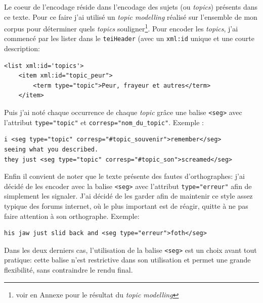 \documentclass[onecolumn,12pt]{article}
\begin{document}
Le coeur de l'encodage réside dans l'encodage des sujets (ou \textit{topics}) présents dans ce texte. Pour ce faire j'ai utilisé un \textit{topic modelling} réalisé sur l'ensemble de mon corpus pour déterminer quels \textit{topics} souligner\footnote{ voir en Annexe pour le résultat du \textit{topic modelling}}. 
Pour encoder les \textit{topics}, j'ai commencé par les lister dans le \texttt{teiHeader} (avec un \texttt{xml:id} unique et une courte description: 
\begin{singlespace}
    
\begin{verbatim}
<list xml:id='topics'>
    <item xml:id="topic_peur">
        <term type="topic">Peur, frayeur et autres</term>
    </item>
\end{verbatim}
\end{singlespace}

Puis j'ai noté chaque occurrence de chaque \textit{topic} grâce une balise \texttt{<seg>} avec l'attribut \texttt{type="topic"} et \texttt{corresp="nom\_du\_topic"}. Exemple : 

\begin{verbatim}
i <seg type="topic" corresp="#topic_souvenir">remember</seg> 
seeing what you described. 
they just <seg type="topic" corresp="#topic_son">screamed</seg>
\end{verbatim}


Enfin il convient de noter que le texte présente des fautes d'orthographes: j'ai décidé de les encoder avec la balise \texttt{<seg>} avec l'attribut \texttt{type="erreur"} afin de simplement les signaler. J'ai décidé de les garder afin de maintenir ce style assez typique des forums internet, où le plus important est de réagir, quitte à ne pas faire attention à son orthographe. Exemple: 
\begin{verbatim}
his jaw just slid back and <seg type="erreur">foth</seg>
\end{verbatim}

Dans les deux derniers cas, l'utilisation de la balise \texttt{<seg>} est un choix avant tout pratique: cette balise n'est restrictive dans son utilisation et permet une grande flexibilité, sans contraindre le rendu final.
\end{document}
